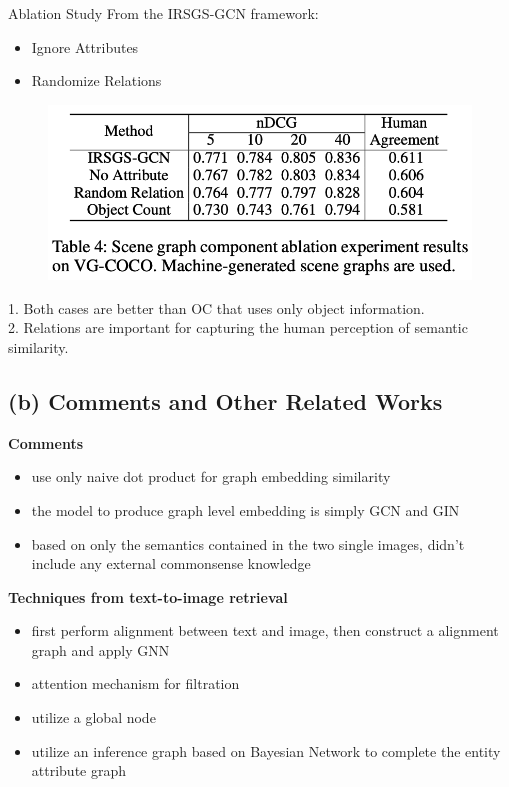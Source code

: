 \documentclass{beamer}
\begin{document}
\begin{frame}{Ablation Study}
From the IRSGS-GCN framework: 
\begin{itemize}
    \item Ignore Attributes
    \item Randomize Relations
\end{itemize}
\begin{figure}[htpb]
    \centering
    \includegraphics[width=0.5\linewidth]{pic/Retrieval/table4.png}
\end{figure}
1. Both cases are better than OC that uses only object information.\\
2. Relations are important for capturing the human perception of semantic similarity.
\end{frame}


\subsection{(b) Comments and Other Related Works}


\begin{frame}
\textbf{Comments}
    \begin{itemize}
        \item use only naive dot product for graph embedding similarity
        \item the model to produce graph level embedding is simply GCN and GIN
        \item based on only the semantics contained in the two single images, didn't include any external commonsense knowledge 
    \end{itemize}
    
\textbf{Techniques from text-to-image retrieval}
\begin{itemize}
    \item first perform alignment between text and image, then construct a alignment graph and apply GNN \cite{DBLP:conf/aaai/DiaoZML21}
    \item attention mechanism for filtration
    \item utilize a global node \cite{DBLP:conf/iccv/PrabhuB15}
    \item utilize an inference graph based on Bayesian Network to complete the entity attribute graph \cite{DBLP:conf/cvpr/XiongZWSW19}
\end{itemize}

\end{frame}
\end{document}
